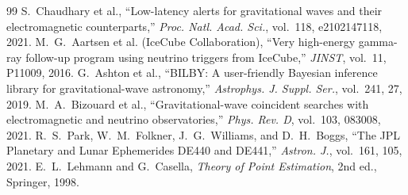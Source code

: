 \documentclass[11pt,a4paper]{article}
\theoremstyle{definition}
\begin{document}
\begin{thebibliography}{99}
S.~Chaudhary et al., ``Low-latency alerts for gravitational waves and their electromagnetic counterparts,'' \textit{Proc. Natl. Acad. Sci.}, vol.~118, e2102147118, 2021.
M.~G.~Aartsen et al. (IceCube Collaboration), ``Very high-energy gamma-ray follow-up program using neutrino triggers from IceCube,'' \textit{JINST}, vol.~11, P11009, 2016.
G.~Ashton et al., ``BILBY: A user-friendly Bayesian inference library for gravitational-wave astronomy,'' \textit{Astrophys. J. Suppl. Ser.}, vol.~241, 27, 2019.
M.~A.~Bizouard et al., ``Gravitational-wave coincident searches with electromagnetic and neutrino observatories,'' \textit{Phys. Rev. D}, vol.~103, 083008, 2021.
R.~S.~Park, W.~M.~Folkner, J.~G.~Williams, and D.~H.~Boggs, ``The JPL Planetary and Lunar Ephemerides DE440 and DE441,'' \textit{Astron. J.}, vol.~161, 105, 2021.
E.~L.~Lehmann and G.~Casella, \textit{Theory of Point Estimation}, 2nd ed., Springer, 1998.
\end{thebibliography}
\end{document}
